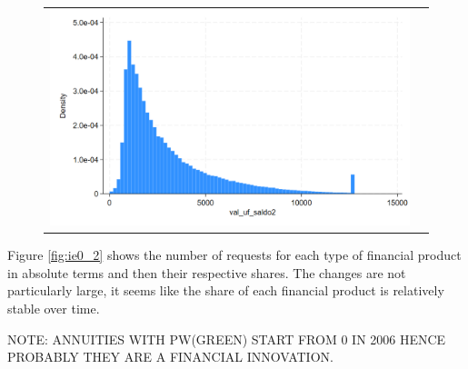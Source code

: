 \documentclass[12pt]{article}
\begin{document}
\begin{figure}[H] \label{fig:ie0_1}
\caption{}
\centering{}%
\begin{tabular}{cc}
\includegraphics[scale=0.27]{figures/IE0_plot1.png} 
\end{tabular}
\end{figure}



Figure \ref{fig:ie0_2} shows the number of requests for each type of financial product in absolute terms and then their respective shares. The changes are not particularly large, it seems like the share of each financial product is relatively stable over time.

NOTE: ANNUITIES WITH PW(GREEN) START FROM 0 IN 2006 HENCE PROBABLY THEY ARE A FINANCIAL INNOVATION. 
\end{document}
